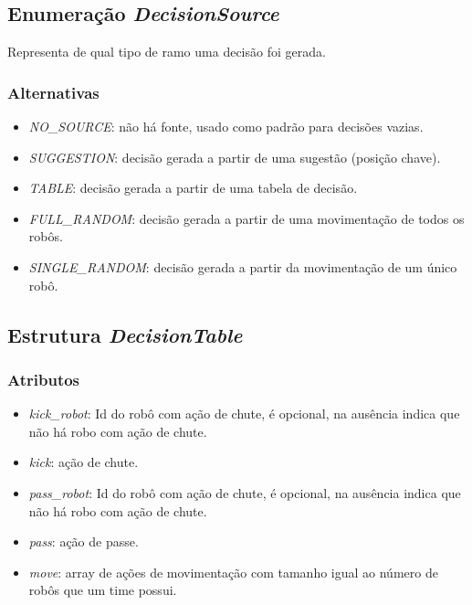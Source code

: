 \subsection*{Enumeração \textit{DecisionSource}}

Representa de qual tipo de ramo uma decisão foi gerada.

\subsubsection*{Alternativas}

\begin{itemize}
  \item \textit{NO_SOURCE}: não há fonte, usado como padrão para decisões
    vazias.
  \item \textit{SUGGESTION}: decisão gerada a partir de uma sugestão (posição
    chave).
  \item \textit{TABLE}: decisão gerada a partir de uma tabela de decisão.
  \item \textit{FULL_RANDOM}: decisão gerada a partir de uma movimentação de
    todos os robôs.
  \item \textit{SINGLE_RANDOM}: decisão gerada a partir da movimentação de um
    único robô.
\end{itemize}

\subsection*{Estrutura \textit{DecisionTable}}

\subsubsection*{Atributos}

\begin{itemize}
  \item \textit{kick_robot}: Id do robô com ação de chute, é opcional, na
    ausência indica que não há robo com ação de chute.
  \item \textit{kick}: ação de chute.
  \item \textit{pass_robot}: Id do robô com ação de chute, é opcional, na
    ausência indica que não há robo com ação de chute.
  \item \textit{pass}: ação de passe.
  \item \textit{move}: array de ações de movimentação com tamanho igual ao
    número de robôs que um time possui.
\end{itemize}

